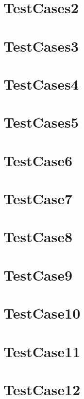 \documentclass[twoside]{article}
\newcommand{\+}{\discretionary{\mbox{\scriptsize$\hookleftarrow$}}{}{}}
\begin{document}
\section{Test\+Cases2}
\label{TestCases2}
\hypertarget{TestCases2}{}

\section{Test\+Cases3}
\label{TestCases3}
\hypertarget{TestCases3}{}

\section{Test\+Cases4}
\label{TestCases4}
\hypertarget{TestCases4}{}

\section{Test\+Cases5}
\label{TestCases5}
\hypertarget{TestCases5}{}

\section{Test\+Case6}
\label{TestCase6}
\hypertarget{TestCase6}{}

\section{Test\+Case7}
\label{TestCase7}
\hypertarget{TestCase7}{}

\section{Test\+Case8}
\label{TestCase8}
\hypertarget{TestCase8}{}

\section{Test\+Case9}
\label{TestCase9}
\hypertarget{TestCase9}{}

\section{Test\+Case10}
\label{TestCase10}
\hypertarget{TestCase10}{}

\section{Test\+Case11}
\label{TestCase11}
\hypertarget{TestCase11}{}

\section{Test\+Case12}
\label{TestCase12}
\hypertarget{TestCase12}{}

\end{document}

